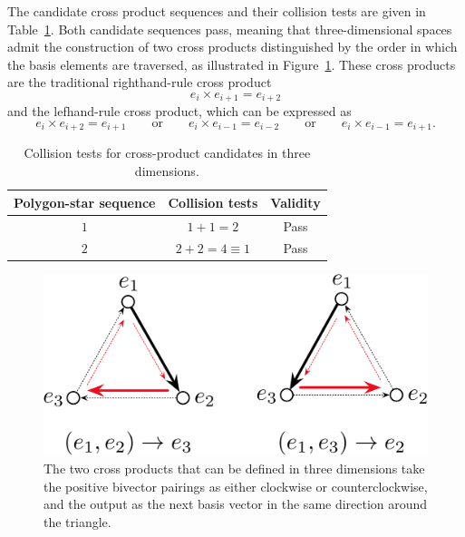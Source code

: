 \documentclass[11pt]{article}
\newcommand{\bv}[1][]{e_{#1}}
\begin{document}
The candidate cross product sequences and their collision tests are given in Table~\ref{tab:3collisiontest}.
Both candidate sequences pass, meaning that three-dimensional spaces admit the construction of two cross products distinguished by the order in which the basis elements are traversed, as illustrated in Figure~\ref{fig:CrossProducts3D}. These cross products are the traditional righthand-rule cross product
\begin{equation}
\bv[i]\times\bv[i+1]=\bv[i+2]
\end{equation}
and the lefhand-rule cross product, which can be expressed as
\begin{equation}
\bv[i]\times\bv[i+2]=\bv[i+1] \qquad \text{or} \qquad \bv[i]\times\bv[i-1]=\bv[i-2] \qquad \text{or} \qquad \bv[i]\times\bv[i-1]=\bv[i+1].
\end{equation}


\begin{table}[tp]
\caption{Collision tests for cross-product candidates in three dimensions.}
\begin{center}
\begin{tabular}{ccc}
\toprule
Polygon-star sequence & Collision tests & Validity \\\hline
$1$ & $1+1 = 2$ & Pass \\
$2$ & $2 + 2 = 4 \equiv 1$ &  Pass
\end{tabular}
\end{center}
\label{tab:3collisiontest}
\end{table}%

\begin{figure}[tbp]
\begin{center}
\includegraphics[width=.75\textwidth]{CrossProducts3D.pdf}
\caption{The two cross products that can be defined in three dimensions take the positive bivector pairings as either clockwise or counterclockwise, and the output as the next basis vector in the same direction around the triangle.}
\label{fig:CrossProducts3D}
\end{center}
\end{figure}
\end{document}
